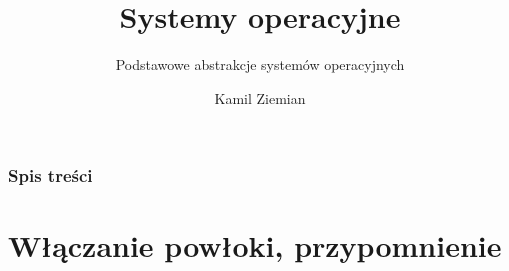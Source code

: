 \documentclass[10pt,t]{beamer}
\title{Systemy operacyjne}
\subtitle{Podstawowe abstrakcje systemów operacyjnych}
\author{Kamil Ziemian \\
  \email}
\begin{document}





\RaggedRight





\maketitle





\begin{frame}
  \frametitle{Spis treści}


  \tableofcontents

\end{frame}





\section{Włączanie powłoki, przypomnienie}
\end{document}
